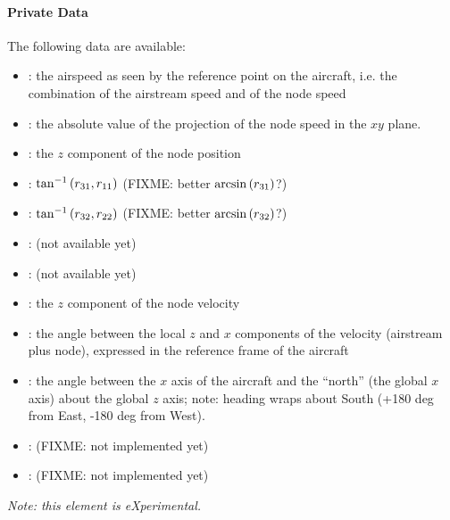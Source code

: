 \paragraph{Private Data}
The following data are available:
\begin{itemize}
\item {}: the airspeed as seen by the reference 
	point on the aircraft, i.e. the combination 
	of the airstream speed and of the node speed
\item {}: the absolute value of the projection
	of the node speed in the $xy$ plane.
\item {}: the $z$ component of the node position
\item {}: $\tan^{-1}\left( r_{31}, r_{11} \right)$
	(FIXME: better $\arcsin\left( r_{31} \right)$?)
\item {}: $\tan^{-1}\left( r_{32}, r_{22} \right)$
	(FIXME: better $\arcsin\left( r_{32} \right)$?)
\item {}: (not available yet)
\item {}: (not available yet)
\item {}: the $z$ component of the node velocity
\item {}: the angle between the local $z$ and $x$ components
	of the velocity (airstream plus node),
	expressed in the reference frame of the aircraft
\item {}: the angle between the $x$ axis of the aircraft 
	and the ``north'' (the global $x$ axis) about the global $z$ axis;
	note: heading wraps about South
	(+180 deg from East, -180 deg from West).
\item {}: (FIXME: not implemented yet)
\item {}: (FIXME: not implemented yet)
\end{itemize}

\noindent
\emph{Note: this element is eXperimental.}




